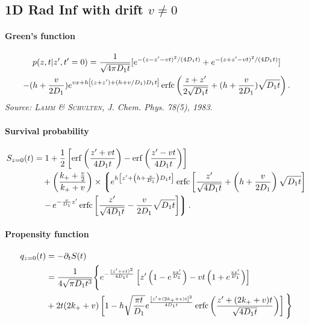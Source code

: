 
\subsection{1D Rad Inf with drift $v\neq 0$}

\paragraph{Green's function}
\begin{multline}
  p(z,t|z',t'=0) = \frac{1}{\sqrt{4\pi D_1 t}} [
  e^{-(z-z'-vt)^2/(4 D_1 t)} +
  e^{-(z+z'-vt)^2/(4 D_1 t)} ] \\
  -(h+\frac{v}{2D_1})e^{vx + h \left[ (z+z') + (h + v/D_1) D_1 t \right]} \operatorname{erfc}\left(\frac{z+z'}{2\sqrt{D_1t}} + (h+\frac{v}{2D_1})\sqrt{D_1t} \right) 
  .\label{green-promoter-solo-drift}
\end{multline}
\textit{Source: \textsc{Lamm \& Schulten}, J. Chem. Phys. 78(5), 1983.}

\paragraph{Survival probability}
\begin{align}
  S_{z=0}(t) &= 1 + \frac{1}{2}\left[ \operatorname{erf}\left( \frac{z'+vt}{4D_1 t}\right) - \operatorname{erf}\left( \frac{z'-vt}{4D_1 t}\right) \right] \\
  &\quad + \left(\frac{k_+ + \frac{v}{2}}{k_+ + v}\right) 
  \times \left\lgroup
	e^{h \left[ z' + \left(h+\frac{v}{D_1}\right) D_1 t \right]} \operatorname{erfc}\left[ \frac{z'}{\sqrt{4D_1 t}} + \left(h+\frac{v}{2D_1}\right)\sqrt{D_1 t} \right] \right.\\
	&\left. \quad- \, e^{- \frac{v}{D_1}z'}
	\operatorname{erfc}\left[ \frac{z'}{\sqrt{4D_1 t}} - \frac{v}{2D_1}\sqrt{D_1 t} \right]
  \right\rgroup.
\end{align}

\paragraph{Propensity function}
\begin{align}
  q_{z=0}(t) &= -\partial_t S(t) \\
  &= \frac{1}{4\sqrt{\pi D_1 t^3}}
	\Bigg\lbrace
		e^{-\frac{(z'+vt)^2}{4D_1 t}} \left[ z'\left( 1-e^{\frac{vz'}{D_1}} \right)
						     - vt \left( 1+e^{\frac{vz'}{D_1}}\right) \right] \\
	&
		+ 2t (2k_+ + v) \left[ 1 - h \sqrt{\frac{\pi t}{D_1}} e^{\frac{\left[z'+(2k_+ + v)t\right]^2}{4D_1 t}}
			\operatorname{erfc}\left(\frac{z' + (2k_+ + v)t}{\sqrt{4 D_1 t}} \right)
		\right]	\Bigg\rbrace
\end{align}
\begin{multline}
\end{multline}

